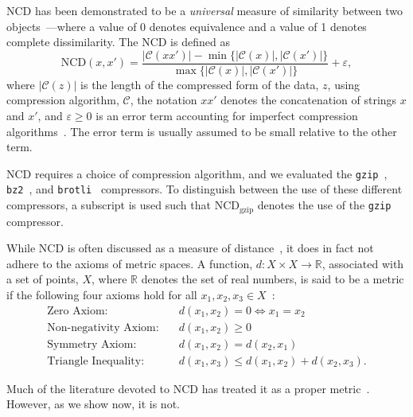 \documentclass[preprint,12pt]{article}
\begin{document}
NCD has been demonstrated to be a \textit{universal} measure of similarity between two objects~\cite{ncd}---where a value of 0 denotes equivalence and a value of 1 denotes complete dissimilarity.
The NCD is defined as~\cite{ncd}
\begin{equation}
    \text{NCD}(x, x') = \frac{|\mathcal{C}(xx')| - \min\{|\mathcal{C}(x)|, |\mathcal{C}(x')|\}}{\max\{|\mathcal{C}(x)|, |\mathcal{C}(x')|\}} + \varepsilon,
    \label{eq:ncd}
\end{equation}
where $|\mathcal{C}(z)|$ is the length of the compressed form of the data, $z$, using compression algorithm, $\mathcal{C}$, the notation $xx'$ denotes the concatenation of strings $x$ and $x'$, and $\varepsilon\geq0$ is an error term accounting for imperfect compression algorithms~\cite{ncd}. The error term is usually assumed to be small relative to the other term.

NCD requires a choice of compression algorithm, and we evaluated the \texttt{gzip}~\cite{gzip}, \texttt{bz2}~\cite{bz2}, and \texttt{brotli}~\cite{google} compressors.
To distinguish between the use of these different compressors, a subscript is used such that NCD$_{\text{gzip}}$ denotes the use of the \texttt{gzip} compressor.

While NCD is often discussed as a measure of distance~\cite{opitz2023gzip,weinreich2023parameter,nishida2011tweet,jiang2022less,ncd}, it does in fact not adhere to the axioms of metric spaces.
A function, $d:X \times X \rightarrow \mathbb{R}$, associated with a set of points, $X$, where $\mathbb{R}$ denotes the set of real numbers, is said to be a metric if the following four axioms hold for all $x_1, x_2, x_3 \in X$~\cite{metrics}:
\begin{align}
    \text{Zero Axiom:} \quad & d(x_1,x_2) = 0 \iff x_1 = x_2 \label{eq:axiom_zero} \\
    \text{Non-negativity Axiom:} \quad & d(x_1,x_2) \geq 0 \label{eq:axiom_nonnegativity} \\
    \text{Symmetry Axiom:} \quad & d(x_1,x_2) = d(x_2, x_1) \label{eq:axiom_symmetry} \\
    \text{Triangle Inequality:} \quad & d(x_1,x_3) \leq d(x_1,x_2) + d(x_2,x_3) \label{eq:axiom_triangle}.
\end{align}

Much of the literature devoted to NCD has treated it as a proper metric~\cite{opitz2023gzip,weinreich2023parameter,nishida2011tweet,jiang2022less}.
However, as we show now, it is not.
\end{document}

